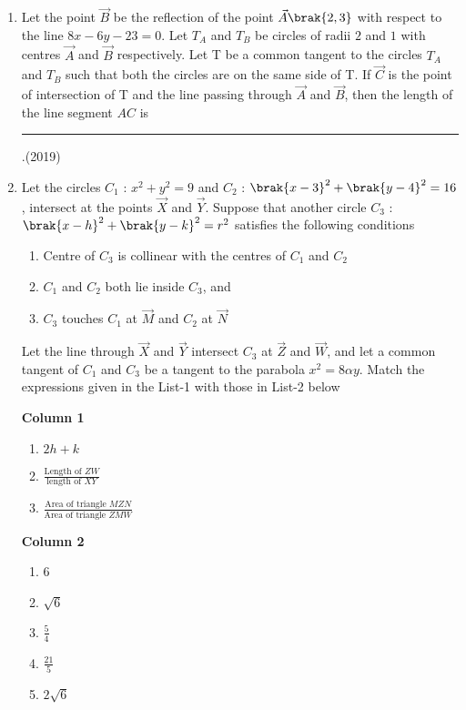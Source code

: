 \begin{enumerate}
\item Let the point $\vec{B}$ be the reflection of the point $\vec{A}\brak{2, 3}$ with respect to the line $8x-6y-23=0$. Let $T_A$ and $T_B$ be circles of radii $2$ and $1$ with centres $\vec{A}$ and $\vec{B}$ respectively. Let T be a common tangent to the circles $T_A$ and $T_B$ such that both the circles are on the same side of T. If $\vec{C}$ is the point of intersection of T and the line passing through $\vec{A}$ and $\vec{B}$, then the length of the line segment $AC$ is  \rule{1cm}{0.01pt}.\hfill(2019)
    \item Let the circles $C_{1}$ : $x^2+y^2=9$ and $C_{2}$ : $\brak{x-3}^2+\brak{y-4}^2 = 16$,  intersect at the points $\vec{X}$ and $\vec{Y}$. Suppose that another circle $C_{3}$ : $\brak{x-h}^2+\brak{y-k}^2=r^2$ satisfies the following conditions
%
%
\begin{enumerate}
 \item Centre of $C_{3}$ is collinear with the centres of $C_{1}$ and $C_{2}$
 \item $C_{1}$ and $C_{2}$ both lie inside $C_{3}$,  and
%
 \item $C_{3}$ touches $C_{1}$ at $\vec{M}$ and $C_{2}$ at  $\vec{N}$ 
\end{enumerate}
Let the line through $\vec{X}$ and $\vec{Y}$ intersect $C_{3}$ at $\vec{Z}$ and $\vec{W}$,  and let a common tangent of $C_{1}$ and $C_{3}$ be a tangent to the parabola $x^2=8\alpha y.$
Match the expressions given in the List-1 with those in List-2 below
%
\begin{multicols}{2}
\textbf{Column 1}
\begin{enumerate}[label=(\Alph*)]           
\item $2h+k$                                  
\item $\frac{\text{Length of } ZW}{\text{length of } XY}$     
\item $\frac{\text{Area of triangle }MZN}{\text{Area of triangle }ZMW}$                     
\end{enumerate}
\columnbreak
 \textbf{Column 2}
\begin{enumerate}[label=(\alph*),  start=16, itemsep=1ex]
 \item 6
 \item $\sqrt{6}$
 \item $\frac{5}{4}$                           
 \item $\frac{21}{5}$                          
 \item $2\sqrt{6}$                             

\end{enumerate}
\end{multicols}
\end{enumerate}
